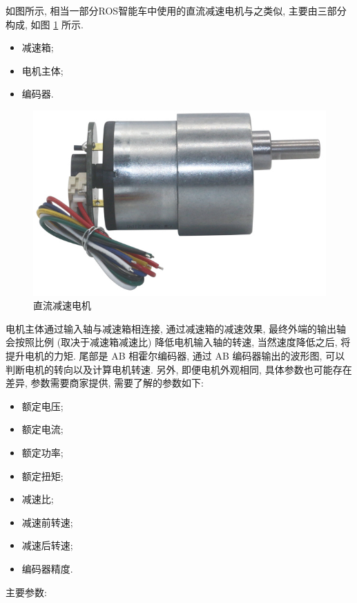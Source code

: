\documentclass[openany, fontset=windowsold]{ctexbook}
\theoremstyle{kaiti}
\theoremstyle{normal}
\begin{document}
如图所示, 相当一部分ROS智能车中使用的直流减速电机与之类似, 主要由三部分构成, 如图 \ref{fig:dc_gear_motor} 所示.

\begin{itemize}
  \item 减速箱;
  \item 电机主体;
  \item 编码器.
\end{itemize}

\begin{figure}[!ht]
  \centering
  \includegraphics[width=.5\textwidth]{dc_gear_motor.jpg}
  \caption{直流减速电机}
  \label{fig:dc_gear_motor}
\end{figure}

电机主体通过输入轴与减速箱相连接, 通过减速箱的减速效果, 最终外端的输出轴会按照比例 (取决于减速箱减速比) 降低电机输入轴的转速, 当然速度降低之后, 将提升电机的力矩. 尾部是 AB 相霍尔编码器, 通过 AB 编码器输出的波形图, 可以判断电机的转向以及计算电机转速. 另外, 即便电机外观相同, 具体参数也可能存在差异, 参数需要商家提供, 需要了解的参数如下:

\begin{itemize}
  \item 额定电压;
  \item 额定电流;
  \item 额定功率;
  \item 额定扭矩;
  \item 减速比;
  \item 减速前转速;
  \item 减速后转速;
  \item 编码器精度.
\end{itemize}

主要参数: 
\end{document}
